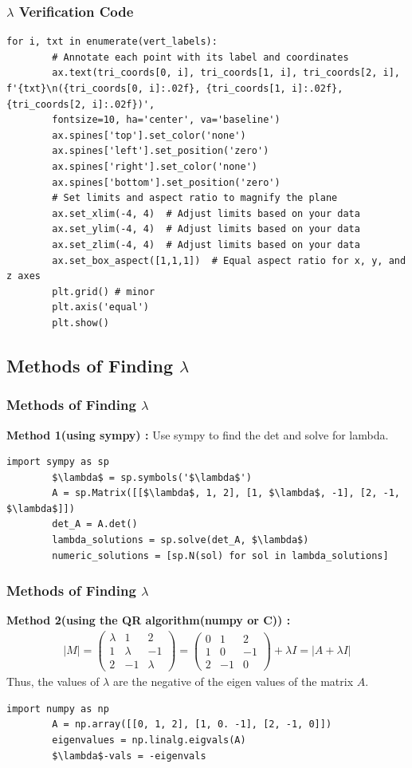 \documentclass{beamer}
\theoremstyle{remark}
\providecommand{\abs}[1]{\left\vert#1\right\vert}
\newcommand{\myvec}[1]{\ensuremath{\begin{pmatrix}#1\end{pmatrix}}}
\numberwithin{equation}{section}
\begin{document}
\begin{frame}[fragile]
	\frametitle{$\lambda$ Verification Code}
	\begin{lstlisting}[mathescape=true]
		for i, txt in enumerate(vert_labels):
		# Annotate each point with its label and coordinates
		ax.text(tri_coords[0, i], tri_coords[1, i], tri_coords[2, i], f'{txt}\n({tri_coords[0, i]:.02f}, {tri_coords[1, i]:.02f}, {tri_coords[2, i]:.02f})',
		fontsize=10, ha='center', va='baseline')
		ax.spines['top'].set_color('none')
		ax.spines['left'].set_position('zero')
		ax.spines['right'].set_color('none')
		ax.spines['bottom'].set_position('zero')
		# Set limits and aspect ratio to magnify the plane
		ax.set_xlim(-4, 4)  # Adjust limits based on your data
		ax.set_ylim(-4, 4)  # Adjust limits based on your data
		ax.set_zlim(-4, 4)  # Adjust limits based on your data
		ax.set_box_aspect([1,1,1])  # Equal aspect ratio for x, y, and z axes
		plt.grid() # minor
		plt.axis('equal')
		plt.show()
	\end{lstlisting}
\end{frame}

\subsection{Methods of Finding $\lambda$}
\begin{frame}[fragile]
	\frametitle{Methods of Finding $\lambda$}
	\textbf{Method 1(using sympy) : } Use sympy to find the det and solve for lambda.
	\begin{lstlisting}[mathescape=true]
		import sympy as sp
		$\lambda$ = sp.symbols('$\lambda$')
		A = sp.Matrix([[$\lambda$, 1, 2], [1, $\lambda$, -1], [2, -1, $\lambda$]])
		det_A = A.det()
		lambda_solutions = sp.solve(det_A, $\lambda$)
		numeric_solutions = [sp.N(sol) for sol in lambda_solutions]
	\end{lstlisting}
		
\end{frame}
\begin{frame}[fragile]
	\frametitle{Methods of Finding $\lambda$}
	\textbf{Method 2(using the QR algorithm(numpy or C)) : } 
	\begin{align}
		\abs{M} = \myvec{\lambda & 1 & 2 \\ 1 & \lambda & -1 \\ 2 & -1 & \lambda} = \myvec{0 & 1 & 2 \\ 1 & 0 & -1 \\ 2 & -1 & 0} + \lambda I = \abs{A + \lambda I}
	\end{align}
	Thus, the values of $\lambda$ are the negative of the eigen values of the matrix $A$.\\
	\begin{lstlisting}[mathescape=true]
		import numpy as np
		A = np.array([[0, 1, 2], [1, 0. -1], [2, -1, 0]])
		eigenvalues = np.linalg.eigvals(A)
		$\lambda$-vals = -eigenvals
	\end{lstlisting}
\end{frame}
\end{document}
